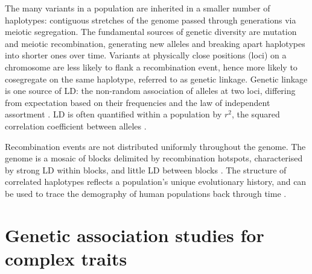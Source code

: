 \begin{outline}
\1 The many variants in a population are inherited in a smaller number of haplotypes: 
contiguous stretches of the genome passed through generations via meiotic segregation.
The fundamental sources of genetic diversity are mutation and meiotic recombination, generating new alleles and breaking apart haplotypes into shorter ones over time.
Variants at physically close positions (loci) on a chromosome are less likely to flank a recombination event, hence more likely to cosegregate on the same haplotype, referred to as genetic linkage.
Genetic linkage is one source of \gls{LD}: the non-random association of alleles at two loci, differing from expectation based on their frequencies and the law of independent assortment \autocite{slatkin2008LinkageDisequilibriumUnderstanding}.
\gls{LD} is often quantified within a population by $r^2$, the squared correlation coefficient between alleles \autocite{slatkin2008LinkageDisequilibriumUnderstanding}.

Recombination events are not distributed uniformly throughout the genome.
The genome is a mosaic of blocks delimited by recombination hotspots, 
characterised by strong \gls{LD} within blocks, and little \gls{LD} between blocks \autocite{wall2003HaplotypeBlocksLinkage,theinternationalhapmapconsortium2007SecondGenerationHuman}.
The structure of correlated haplotypes reflects a population's unique evolutionary history, and can be used to trace the demography of human populations back through time \autocite{karczewski2020AnalyticTranslationalGenetics}.


\section{Genetic association studies for complex traits}


\end{outline}
